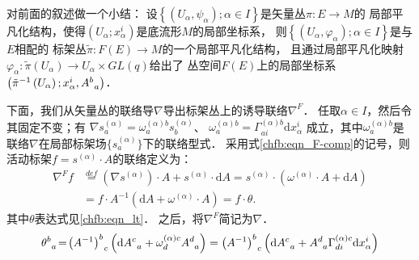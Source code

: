 对前面的叙述做一个小结：
设$\left\{\left(U_{\alpha}, \psi_{\alpha}\right) ; \alpha \in I\right\}$是矢量丛$\pi: E \rightarrow M$的
局部平凡化结构，使得$\left(U_{\alpha} ; x_{\alpha}^{i}\right)$是底流形$M$的局部坐标系，
则$\left\{\left(U_{\alpha}, \varphi_{\alpha}\right) ; \alpha \in I\right\}$是与$E$相配的
标架丛$\tilde{\pi}: F(E) \rightarrow M$的一个局部平凡化结构，
且通过局部平凡化映射$\varphi_{\alpha}: \tilde{\pi}\left(U_{\alpha}\right) \rightarrow U_{\alpha} \times GL(q)$给出了
丛空间$F(E)$上的局部坐标系$\left(\tilde{\pi}^{-1}\left(U_{\alpha}\right) ; x_{\alpha}^{i}, A_{\hphantom{a}a}^{b}\right)$．


下面，我们从矢量丛的联络导$\nabla$导出标架丛上的诱导联络$\nabla^F$．
任取$\alpha \in I$，然后令其固定不变；有 
$ \nabla s_{a}^{(\alpha)}=\omega_{a}^{(\alpha) b} s_{b}^{(\alpha)}$、 
$ \omega_{a}^{(\alpha) b}=\Gamma_{a i}^{(\alpha) b} \mathrm{d} x_{\alpha}^{i} $
成立，其中$\omega_{a}^{(\alpha) b}$是联络$\nabla$在局部标架场$\{s_{a}^{(\alpha)}\}$下的联络型式．
采用式\eqref{chfb:eqn_F-comp}的记号，则活动标架$f=s^{(\alpha)} \cdot A$的联络定义为： 
\begin{equation}\label{chfb:eqn_Frame-connection}
\begin{aligned}
    \nabla^F f & \overset{def}{=}\left(\nabla s^{(\alpha)}\right) \cdot A + s^{(\alpha)} \cdot \mathrm{d} A
    =s^{(\alpha)} \cdot \left(\omega^{(\alpha)} \cdot A+\mathrm{d} A\right)  \\
    & =f \cdot A^{-1}\left(\mathrm{d} A+\omega^{(\alpha)} \cdot A\right)
    =f \cdot \theta .    
\end{aligned}\end{equation}
其中$\theta$表达式见\eqref{chfb:eqn_lt}．
之后，将$\nabla^F$简记为$\nabla$．
\begin{equation}\label{chfb:eqn_lt}
    \theta_{\hphantom{a}a}^{b}\! =\! \left(A^{-1}\right)_{\hphantom{a}c}^{b}
    \left(\mathrm{d} A_{\hphantom{a}a}^{c}+\omega_{d}^{(\alpha) c} A_{\hphantom{a}a}^{d} \right) 
    =\left(A^{-1}\right)_{\hphantom{a}c}^{b}\left(\mathrm{d} A_{\hphantom{a}a}^{c}+A_{\hphantom{a}a}^{d}
     \Gamma_{d i}^{(\alpha) c} \mathrm{d} x_{\alpha}^{i}\right) 
\end{equation}



